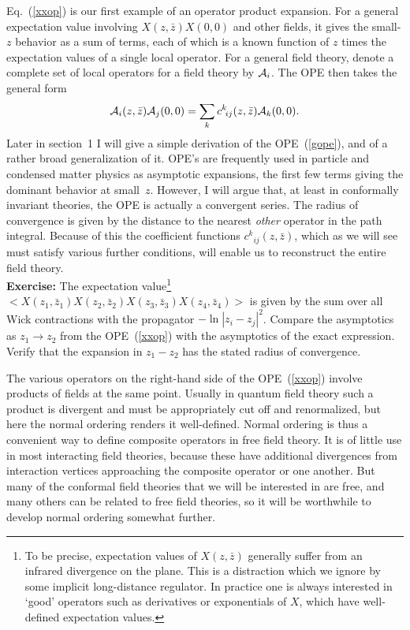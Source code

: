 Eq.~(\ref{xxop}) is our first example of an operator product
expansion.  For a general expectation value involving
$X(z,\bar z) X(0,0)$ and other fields, it gives the small-$z$
behavior as a sum of terms, each of which is a known
function of $z$ times the expectation values of a single local
operator.
For a general field theory, denote a complete set of local
operators for a field theory by
${\cal A}_i$.  The OPE then takes the general form
\begin{equation}
{\cal A}_i(z,\bar z) {\cal A}_j(0,0)
= \sum_k c^k\!_{ij}(z,\bar z){\cal A}_k(0,0). \label{gope}
\end{equation}
Later in section~1 I will give a simple derivation of the
OPE~(\ref{gope}), and of a rather broad
generalization of it.  OPE's are frequently used in particle and
condensed matter physics as asymptotic expansions, the first few
terms giving the dominant behavior at small~$z$.  However, I
will argue that, at least in conformally invariant theories,
the OPE is actually a convergent series.  The radius of convergence
is given by the distance to the nearest {\it other} operator in
the path integral.  Because of this the coefficient functions
$c^k\!_{ij}(z,\bar z)$, which as we will see must satisfy various
further conditions, will enable us to reconstruct the entire field
theory.\\[3pt]
{\bf Exercise:} The expectation value\footnote
{To be precise, expectation values of $X(z,\bar z)$ generally
suffer from an infrared divergence on the plane.  This is a
distraction which we ignore by some implicit long-distance
regulator.  In practice one is always interested in `good'
operators such as derivatives or exponentials of $X$, which have
well-defined expectation values.}
$<X(z_1,\bar z_1) X(z_2,\bar z_2) X(z_3,\bar z_3) X(z_4,\bar z_4)>$
is given by the sum over all Wick contractions with the propagator
$- \ln |z_i - z_j|^2$.  Compare the asymptotics as $z_1 \to z_2$
from the OPE~(\ref{xxop}) with the asymptotics of the exact
expression.  Verify that the expansion in $z_1 - z_2$ has the
stated radius of convergence.

The various operators on the right-hand side of the
OPE~(\ref{xxop}) involve products of fields at the same point.
Usually in quantum field theory such a product is divergent and must
be appropriately cut off and renormalized, but here the
normal ordering renders it well-defined.  Normal ordering is thus a
convenient way to define composite operators in free field theory.
It is of little use in most interacting field theories, because 
these have additional divergences from interaction vertices
approaching the composite operator or one another.  But many
of the conformal field theories that we will be interested in are
free, and many others can be related to free field theories, so it
will be worthwhile to develop normal ordering somewhat further.

